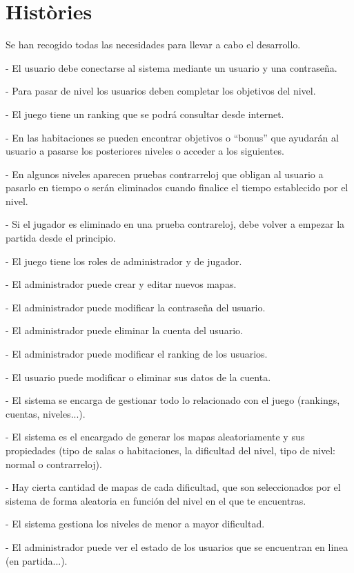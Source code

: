 \section{Històries}

Se han recogido todas las necesidades para llevar a cabo el desarrollo.

-	El usuario debe conectarse al sistema mediante un usuario y una contraseña.

-	Para pasar de nivel los usuarios deben completar los objetivos del nivel.

-	El juego tiene un ranking que se podrá consultar desde internet.

-	En las habitaciones se pueden encontrar objetivos o “bonus” que ayudarán al usuario a pasarse los posteriores niveles o acceder a los siguientes.

-	En algunos niveles aparecen pruebas contrarreloj que obligan al usuario a pasarlo en tiempo o serán eliminados cuando finalice el tiempo establecido por el nivel.

-	Si el jugador es eliminado en una prueba contrareloj, debe volver a empezar la partida desde el principio.

-	El juego tiene los roles de administrador y de jugador.

-	El administrador puede crear y editar nuevos mapas.

-	El administrador puede modificar la contraseña del usuario.

-	El administrador puede eliminar la cuenta del usuario.

-	El administrador puede modificar el ranking de los usuarios.

-	El usuario puede modificar o eliminar sus datos de la cuenta.

-	El sistema se encarga de gestionar todo lo relacionado con el juego (rankings, cuentas, niveles...).

-	El sistema es el encargado de generar los mapas aleatoriamente y sus propiedades (tipo de salas o habitaciones, la dificultad del nivel, tipo de nivel: normal o contrarreloj).

-	Hay cierta cantidad de mapas de cada dificultad, que son seleccionados por el sistema de forma aleatoria en función del nivel en el que te encuentras.

-	El sistema gestiona los niveles de menor a mayor dificultad.

-	El administrador puede ver el estado de los usuarios que se encuentran en linea (en partida...).

